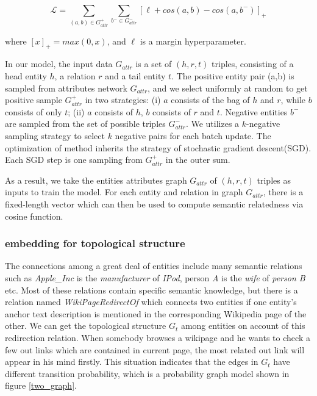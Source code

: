\begin{small}
    \begin{equation}
        \nonumber
        \label{starspace_formula}
        \mathcal{L} = \sum_{(a,b) \in G_{attr}^+}^{ } \sum_{b^- \in G_{attr}^-}^{ }[\ell + cos(a,b)-cos(a,b^-)]_+
    \end{equation}
\end{small}where $[x]_+=max(0, x)$, and $\ell$ is a margin hyperparameter. 

In our model, the input data $G_{attr}$ is a set of $(h, r, t)$ triples, consisting of a head entity $h$, 
a relation $r$ and a tail entity $t$. The positive entity pair (a,b) is sampled from
attributes network $G_{attr}$, and we select uniformly at random to get positive sample $G_{attr}^+$ in two strategies:
(i) $a$ consists of the bag of $h$ and $r$, while $b$ consists of only $t$; 
(ii) $a$ consists of $h$, $b$ consists of $r$ and $t$. 
Negative entities $b^-$ are sampled from the set of possible triples $G_{attr}^-$.  
We utilizes a $k$-negative sampling strategy\cite{corr/Mikolov13} to select $k$ negative pairs for each batch update.
The optimization of method inherits the strategy of stochastic gradient descent(SGD). Each SGD step is one
sampling from $G_{attr}^+$ in the outer sum.

As a result, we take the entities attributes graph $G_{attr}$ of $(h, r, t)$ triples as inputs to train the model.
For each entity and relation in graph $G_{attr}$, there is a fixed-length vector which can
then be used to compute semantic relatedness via cosine function.


\subsubsection{embedding for topological structure}
The connections among a great deal of entities include many semantic relations such as \emph{Apple\_Inc} is the
\emph{manufacturer} of \emph{IPod}, person \emph{A} is the \emph{wife} of \emph{person B} etc. Most of these
relations contain specific semantic knowledge, but there is a relation named \emph{WikiPageRedirectOf} which
connects two entities if one entity's anchor text description is mentioned in the corresponding Wikipedia page of the other.
We can get the topological structure $G_{t}$ among entities on account of this redirection relation.
When somebody browses a wikipage and he wants to check a few out links which
are contained in current page, the most related out link will appear in his mind firstly. This situation indicates that
the edges in $G_{t}$ have different transition probability, which is a probability graph model shown in figure \ref{two_graph}.

